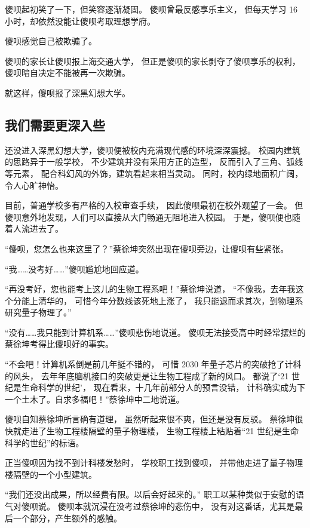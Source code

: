 \documentclass[UTF8,a4paper,11pt]{ctexart}
\newcommand{\p}{傻呗} %
\newcommand{\q}{蔡徐坤} %
\newcommand{\X}{深黑幻想大学} %
\begin{document}
      \p 起初笑了一下，但笑容逐渐凝固。
      \p 曾最反感享乐主义，
      但每天学习 16 小时，却依然没能让\p 考取理想学府。

      \p 感觉自己被欺骗了。

      \p 的家长让\p 报上海交通大学，
      但正是\p 的家长剥夺了\p 享乐的权利，
      \p 暗自决定不能被再一次欺骗。
      
      就这样，\p 报了\X 。
    \subsection{我们需要更深入些}
      还没进入\X ，\p 便被校内充满现代感的环境深深震撼。
      校园内建筑的思路异于一般学校，
      不少建筑并没有采用方正的造型，
      反而引入了三角、弧线等元素，
      配合科幻风的外饰，建筑看起来相当灵动。
      同时，校内绿地面积广阔，令人心旷神怡。

      目前，普通学校多有严格的入校审查手续，
      因此\p 最初在校外观望了一会。
      但\p 意外地发现，人们可以直接从大门畅通无阻地进入校园。
      于是，\p 便也随着人流进去了。
      
      “\p，您怎么也来这里了？”\q 突然出现在\p 旁边，让\p 有些紧张。

      “我……没考好……”\p 尴尬地回应道。

      “再没考好，您也能考上这儿的生物工程系吧！”\q 说道，
      “不像我，去年我这个分能上清华的，
      可惜今年分数线该死地上涨了，
      我只能退而求其次，到物理系研究量子物理了。”

      “没有……我只能到计算机系……”\p 悲伤地说道。
      \p 无法接受高中时经常摆烂的\q 考得比\p 好的事实。

      “不会吧！计算机系倒是前几年挺不错的，
      可惜 2030 年量子芯片的突破抢了计科的风头，
      去年年底脑机接口的突破更是让生物工程成了新的风口。
      都说了‘21 世纪是生命科学的世纪’，
      现在看来，十几年前部分人的预言没错，
      计科确实成为下一个土木了。自求多福吧！”\q 中二地说道。

      \p 自知\q 所言确有道理，
      虽然听起来很不爽，但还是没有反驳。
      \q 很快就走进了生物工程楼隔壁的量子物理楼，
      生物工程楼上粘贴着“21 世纪是生命科学的世纪”的标语。

      正当\p 因为找不到计科楼发愁时，
      学校职工找到\p，
      并带他走进了量子物理楼隔壁的一个小型建筑。

      “我们还没出成果，所以经费有限。以后会好起来的。”
      职工以某种类似于安慰的语气对\p 说。
      \p 本就沉浸在没考过\q 的悲伤中，
      没有对这番话，尤其是最后一个部分，产生额外的感触。
\end{document}
